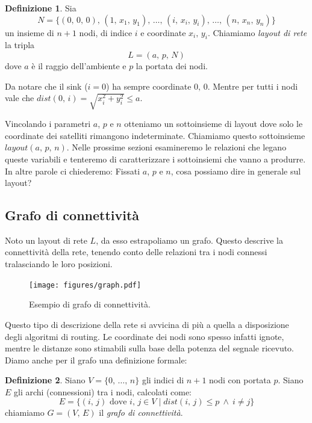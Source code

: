 \documentclass[a4paper,12pt]{article}
\theoremstyle{definition}
\newtheorem{definition}{Definizione}
\begin{document}
\begin{definition}
Sia
\begin{equation*}
N = \{(0,\,0,\,0),\,(1,\,x_1,\,y_1),\,\dots,\,(i,\,x_i,\,y_i),\,\dots,\,(n,\,x_n,\,y_n)\}
\end{equation*}
un insieme di $n+1$ nodi, di indice $i$ e coordinate $x_i,\,y_i$. Chiamiamo \emph{layout di rete} la tripla
\begin{equation*}
L = (a,\,p,\,N)
\end{equation*}
dove $a$ è il raggio dell'ambiente e $p$ la portata dei nodi.
\end{definition}

Da notare che il sink ($i=0$) ha sempre coordinate $0,\,0$. Mentre per tutti i nodi vale che $dist(0,\,i) = \sqrt{x_i^2+y_i^2} \leq a$.

Vincolando i parametri $a$, $p$ e $n$ otteniamo un sottoinsieme di layout dove solo le coordinate dei satelliti rimangono indeterminate. Chiamiamo questo sottoinsieme $layout(a,\,p,\,n)$. Nelle prossime sezioni esamineremo le relazioni che legano queste variabili e tenteremo di caratterizzare i sottoinsiemi che vanno a produrre. In altre parole ci chiederemo: Fissati $a$, $p$ e $n$, cosa possiamo dire in generale sul layout?

\subsection{Grafo di connettività}

Noto un layout di rete $L$, da esso estrapoliamo un grafo. Questo descrive la connettività della rete, tenendo conto delle relazioni tra i nodi connessi tralasciando le loro posizioni.

\begin{figure}[H]
\centering
\texttt{[image: figures/graph.pdf]}
\caption{Esempio di grafo di connettività.}
\end{figure}

Questo tipo di descrizione della rete si avvicina di più a quella a disposizione degli algoritmi di routing. Le coordinate dei nodi sono spesso infatti ignote, mentre le distanze sono stimabili sulla base della potenza del segnale ricevuto. Diamo anche per il grafo una definizione formale:

\begin{definition}
Siano $V = \{0,\,\dots,\,n\}$ gli indici di $n+1$ nodi con portata $p$. Siano $E$ gli archi (connessioni) tra i nodi, calcolati come:
\begin{equation*}
E = \{ (i,\,j) \text{ dove } i,\,j \in V \mid dist(i,\,j) \le p \ \wedge \ i \neq j\}
\end{equation*}
chiamiamo $G = (V,\,E)$ il \emph{grafo di connettività}.
\end{definition}
\end{document}

